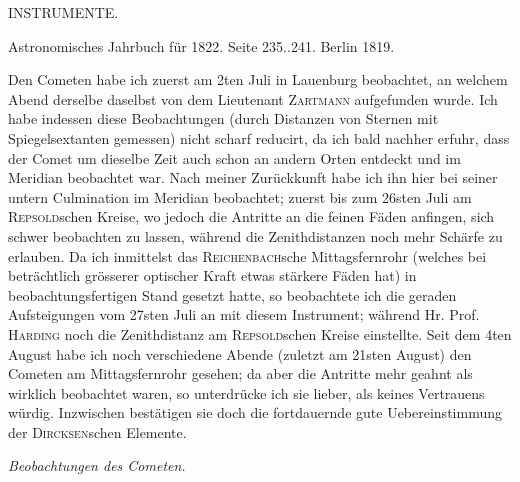 \clearpage
{}
\hypertarget{native-429-part-lower}{}
\begin{center}{\Large INSTRUMENTE.}\end{center}
\begin{center}
Astronomisches Jahrbuch für 1822. Seite 235..241. Berlin 1819.
\end{center}

\par\indent Den Cometen habe ich zuerst am 2ten Juli in Lauenburg beobachtet, an welchem Abend derselbe daselbst von dem Lieutenant \textsc{Zartmann} aufgefunden wurde. Ich habe indessen diese Beobachtungen (durch Distanzen von Sternen mit Spiegelsextanten gemessen) nicht scharf reducirt, da ich bald nachher erfuhr, dass der Comet um dieselbe Zeit auch schon an andern Orten entdeckt und im Meridian beobachtet war. Nach meiner Zurückkunft habe ich ihn hier bei seiner untern Culmination im Meridian beobachtet; zuerst bis zum 26sten Juli am \textsc{Repsold}schen Kreise, wo jedoch die Antritte an die feinen Fäden anfingen, sich schwer beobachten zu lassen, während die Zenithdistanzen noch mehr Schärfe zu erlauben. 
Da ich inmittelst das \textsc{Reichenbach}sche Mittagsfernrohr (welches bei beträchtlich grösserer optischer Kraft etwas stärkere Fäden hat) in beobachtungsfertigen Stand gesetzt hatte, so beobachtete ich die geraden Aufsteigungen vom 27sten Juli an mit diesem Instrument; während Hr. Prof. \textsc{Harding} noch die Zenithdistanz am \textsc{Repsold}schen Kreise einstellte. Seit dem 4ten August habe ich noch verschiedene Abende (zuletzt am 21sten August) den Cometen am Mittagsfernrohr gesehen; da aber die 
Antritte mehr geahnt als wirklich beobachtet waren, so unterdrücke ich sie lieber, als keines Vertrauens würdig. Inzwischen bestätigen sie doch die fortdauernde gute Uebereinstimmung der \textsc{Dircksen}schen Elemente.

\begin{center}
\emph{Beobachtungen des Cometen.}
\end{center}

